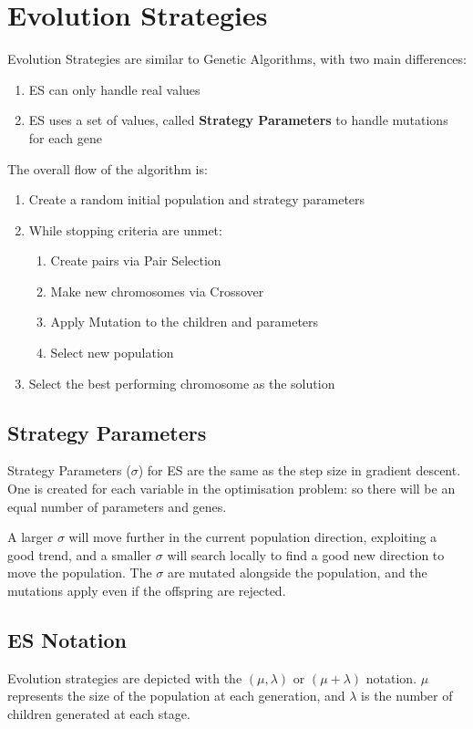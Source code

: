 \section{Evolution Strategies}
Evolution Strategies are similar to Genetic Algorithms, with two main differences: 

\begin{enumerate}
    \item ES can only handle real values
    \item ES uses a set of values, called \textbf{Strategy Parameters} to handle mutations for each gene
\end{enumerate}
The overall flow of the algorithm is: 
\begin{enumerate}[label=\Alph*]
\item Create a random initial population and strategy parameters
\item While stopping criteria are unmet:
\begin{enumerate}[label=\arabic*]
    \item Create pairs via Pair Selection
    \item Make new chromosomes via Crossover
    \item Apply Mutation to the children and parameters
    \item Select new population 
\end{enumerate}
\item Select the best performing chromosome as the solution\\
\end{enumerate}

\subsection{Strategy Parameters}
Strategy Parameters ($\sigma$) for ES are the same as the step size in gradient descent. One is created for each variable in the optimisation problem: so there will be an equal number of parameters and genes. 

A larger $\sigma$ will move further in the current population direction, exploiting a good trend, and a smaller $\sigma$ will search locally to find a good new direction to move the population. The $\sigma$ are mutated alongside the population, and the mutations apply even if the offspring are rejected.

\subsection{ES Notation}
Evolution strategies are depicted with the $(\mu, \lambda)$ or $(\mu + \lambda)$ notation. $\mu$ represents the size of the population at each generation, and $\lambda$ is the number of children generated at each stage.

